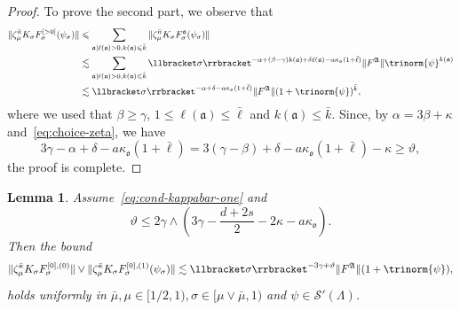 \documentclass{article}
\numberwithin{equation}{section}
\theoremstyle{plain}
\newtheorem{lemma}[theorem]{Lemma}
\theoremstyle{definition}
\begin{document}
\begin{proof}
  To prove the second part, we observe that
  \begin{align*}
    \| \zeta_{\mu}^{\bar{\kappa}} K_{\sigma} F^{[> 0]}_{\sigma}
    (\psi_{\sigma}) \| &\leqslant  \sum_{\mathfrak{a} \mid \ell
    (\mathfrak{a}) > 0, k (\mathfrak{a}) \leqslant \bar{k}} \|
    \zeta_{\mu}^{\bar{\kappa}} K_{\sigma} F^{\mathfrak{a}}_{\sigma}
    (\psi_{\sigma}) \|\\
 &\lesssim  \sum_{\mathfrak{a} \mid \ell (\mathfrak{a}) > 0, k
    (\mathfrak{a}) \leqslant \bar{k}} \llbracket \sigma \rrbracket^{- \alpha +
    (\beta - \gamma) k (\mathfrak{a}) + \delta \ell (\mathfrak{a}) - a
    \kappa_{\mathfrak{o}} (1 + \bar{\ell})}  \| F^{\mathfrak{A}} \| 
    {\trinorm{ \psi }^{k (\mathfrak{a})}} \\
 &\lesssim  \llbracket \sigma \rrbracket^{- \alpha + \delta - a
    \kappa_{\mathfrak{o}} (1 + \bar{\ell})}  \| F^{\mathfrak{A}} \|  (1 +
    \trinorm{ \psi } )^{\bar{k}},
  \end{align*}
  where we used that $\beta \geqslant \gamma$, $1 \leqslant \ell
  (\mathfrak{a}) \leqslant \bar{\ell}$ and $k (\mathfrak{a}) \leqslant
  \bar{k}$. Since, by $\alpha = 3 \beta + \kappa$ and~\eqref{eq:choice-zeta},
  we have
  \[ 3 \gamma - \alpha + \delta - a \kappa_{\mathfrak{o}} (1 + \bar{\ell}) = 3
     (\gamma - \beta) + \delta - a \kappa_{\mathfrak{o}} (1 + \bar{\ell}) -
     \kappa \geqslant \vartheta, \]
  the proof is complete.
\end{proof}

\begin{lemma}
  \label{lem:l-0-kernels}Assume~\eqref{eq:cond-kappabar-one} and
  \begin{equation}
    \vartheta \leqslant 2 \gamma \wedge \left( 3 \gamma - \frac{d + 2 s}{2} -
    2 \kappa - a \kappa_{\mathfrak{o}} \right) . \label{eq:xi-on-zeta}
  \end{equation}
  Then the bound
  \[ \| \zeta_{\mu}^{\bar{\kappa}} K_{\sigma} F^{[0], (0)}_{\sigma} \| \vee \|
     \zeta_{\mu}^{\bar{\kappa}} K_{\sigma} F^{[0], (1)}_{\sigma}
     (\psi_{\sigma}) \| \lesssim \llbracket \sigma \rrbracket^{- 3 \gamma +
     \vartheta}  \| F^{\mathfrak{A}} \|  (1 + \trinorm{ \psi }),
  \]
  holds uniformly in $\bar{\mu}, \mu \in [1 / 2, 1), \sigma \in [\mu \vee
  \bar{\mu}, 1) $ and $\psi \in \mathcal{S}' (\Lambda)$.
\end{lemma}
\end{document}
